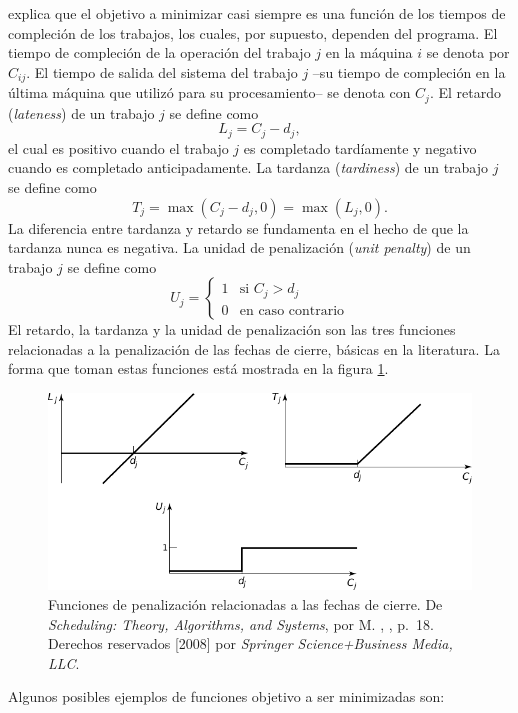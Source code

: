 \documentclass[spanish,draft,12pt,headsepline,footsepline,paper=letter]{scrreprt}
\begin{document}
\citet[p.~18]{Pinedo1995} explica que el objetivo a minimizar casi siempre es una función de los tiempos de compleción de los trabajos, los cuales, por supuesto, dependen del programa. 
El tiempo de compleción de la operación del trabajo $j$ en la máquina $i$ se denota por $C_{ij}$. El tiempo de salida del sistema del trabajo $j$ –su tiempo de compleción en la última máquina que utilizó para su procesamiento– se denota con $C_j$.
%
El retardo (\textit{lateness}) de un trabajo $j$ se define como 
\[ L_j = C_j - d_j, \]
el cual es positivo cuando el trabajo $j$ es completado tardíamente y negativo cuando es completado anticipadamente. La tardanza (\textit{tardiness}) de un trabajo $j$ se define como
\[ T_j = \max(C_j - d_j, 0) = \max(L_j, 0). \]
La diferencia entre tardanza y retardo se fundamenta en el hecho de que la tardanza nunca es negativa. La unidad de penalización (\textit{unit penalty}) de un trabajo $j$ se define como
\[ U_j = \left\{
    \begin{array}{ll}
      1 & \mbox{si } C_j > d_j \\
      0 & \mbox{en caso contrario}
    \end{array}
  \right. \]
El retardo, la tardanza y la unidad de penalización son las tres funciones relacionadas a la penalización de las fechas de cierre, básicas en la literatura. La forma que toman estas funciones está mostrada en la figura \ref{fig:penalty_fun}.

\begin{figure}[hbtp]
\centering
\includegraphics[width=.8\textwidth]{media/penalty_functions.pdf}
\caption[Funciones de penalización]{Funciones de penalización relacionadas a las fechas de cierre. De \textit{Scheduling: Theory, Algorithms, and Systems}, por M. \citeauthor{Pinedo1995}, \citeyear{Pinedo1995}, p.~18. Derechos reservados [2008] por \textit{Springer Science+Business Media, LLC}.}
\label{fig:penalty_fun}
\end{figure}

Algunos posibles ejemplos de funciones objetivo a ser minimizadas son:
\end{document}

